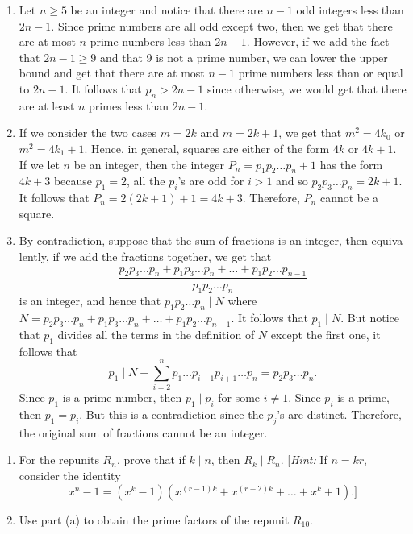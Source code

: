 \begin{solution}
    \begin{enumerate}
        \item Let $n \geq 5$ be an integer and notice that there are $n - 1$ odd integers less than $2n-1$. Since prime numbers are all odd except two, then we get that there are at most $n$ prime numbers less than $2n-1$. However, if we add the fact that $2n-1 \geq 9$ and that $9$ is not a prime number, we can lower the upper bound and get that there are at most $n-1$ prime numbers less than or equal to $2n-1$. It follows that $p_n > 2n-1$ since otherwise, we would get that there are at least $n$ primes less than $2n-1$.
        \item If we consider the two cases $m = 2k$ and $m = 2k+1$, we get that $m^2 = 4k_0$ or $m^2 = 4k_1 + 1$. Hence, in general, squares are either of the form $4k$ or $4k+1$. If we let $n$ be an integer, then the integer $P_n = p_1p_2 \dots p_n + 1$ has the form $4k+3$ because $p_1 = 2$, all the $p_i$'s are odd for $i > 1$ and so $p_2p_3 \dots p_n = 2k+1$. It follows that $P_n = 2(2k+1) + 1 = 4k+3$. Therefore, $P_n$ cannot be a square.
        \item By contradiction, suppose that the sum of fractions is an integer, then equiva-lently, if we add the fractions together, we get that
        $$\frac{p_2p_3\dots p_n + p_1p_3\dots p_n + \dots + p_1p_2\dots p_{n-1}}{p_1p_2\dots p_n}$$
        is an integer, and hence that $p_1p_2\dots p_n \mid N$ where $N = p_2p_3\dots p_n + p_1p_3\dots p_n + \dots + p_1p_2\dots p_{n-1}$. It follows that $p_1 \mid N$. But notice that $p_1$ divides all the terms in the definition of $N$ except the first one, it follows that
        $$p_1 \mid N - \sum_{i=2}^{n}p_1 \dots p_{i-1} p_{i+1} \dots p_n = p_2p_3\dots p_n.$$
        Since $p_1$ is a prime number, then $p_1 \mid p_i$ for some $i \neq 1$. Since $p_i$ is a prime, then $p_1 = p_i$. But this is a contradiction since the $p_j$'s are distinct. Therefore, the original sum of fractions cannot be an integer.
    \end{enumerate}
\end{solution}

\begin{exercise}
    \begin{enumerate}
        \item For the repunits $R_n$, prove that if $k \mid n$, then $R_k \mid R_n$. [\textit{Hint:} If $n = kr$, consider the identity
        $$x^n - 1 = (x^k - 1)(x^{(r-1)k} + x^{(r-2)k} + \dots + x^k + 1) .]$$
        \item Use part (a) to obtain the prime factors of the repunit $R_{10}$.
    \end{enumerate}
\end{exercise}


